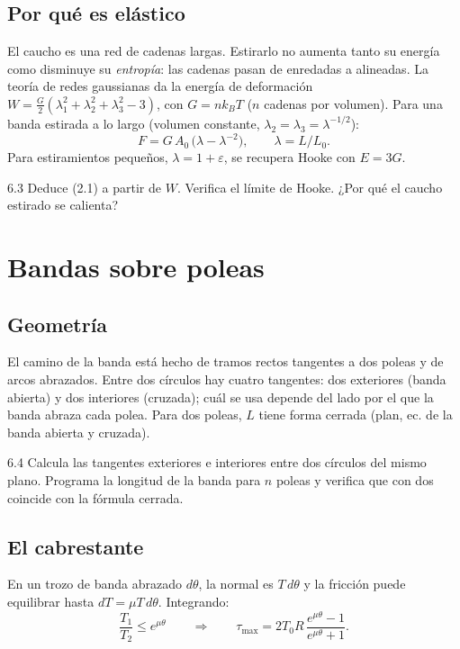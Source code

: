 \documentclass[11pt,a4paper]{article}
\begin{document}
\subsection{Por qué es elástico}
El caucho es una red de cadenas largas. Estirarlo no aumenta tanto su energía como disminuye su \emph{entropía}: las
cadenas pasan de enredadas a alineadas. La teoría de redes gaussianas da la energía de deformación
$W = \tfrac G2(\lambda_1^2+\lambda_2^2+\lambda_3^2-3)$, con $G = nk_BT$ ($n$ cadenas por volumen). Para una banda
estirada a lo largo (volumen constante, $\lambda_2 = \lambda_3 = \lambda^{-1/2}$):
\begin{equation}
  F = G\,A_0\,\bigl(\lambda - \lambda^{-2}\bigr),\qquad \lambda = L/L_0 .
\end{equation}
Para estiramientos pequeños, $\lambda = 1+\varepsilon$, se recupera Hooke con $E = 3G$.

\begin{ejercicio}{6.3}
Deduce (2.1) a partir de $W$. Verifica el límite de Hooke. ¿Por qué el caucho estirado se calienta?
\end{ejercicio}

\section{Bandas sobre poleas}

\subsection{Geometría}
El camino de la banda está hecho de tramos rectos tangentes a dos poleas y de arcos abrazados. Entre dos círculos hay
cuatro tangentes: dos exteriores (banda abierta) y dos interiores (cruzada); cuál se usa depende del lado por el que
la banda abraza cada polea. Para dos poleas, $L$ tiene forma cerrada (plan, ec. de la banda abierta y cruzada).

\begin{ejercicio}{6.4}
Calcula las tangentes exteriores e interiores entre dos círculos del mismo plano. Programa la longitud de la banda
para $n$ poleas y verifica que con dos coincide con la fórmula cerrada.
\end{ejercicio}

\subsection{El cabrestante}
En un trozo de banda abrazado $d\theta$, la normal es $T\,d\theta$ y la fricción puede equilibrar hasta
$dT = \mu T\,d\theta$. Integrando:
\begin{equation}
  \frac{T_1}{T_2}\le e^{\mu\theta}\qquad\Longrightarrow\qquad \tau_{\max} = 2T_0R\,\frac{e^{\mu\theta}-1}{e^{\mu\theta}+1}.
\end{equation}
\end{document}
